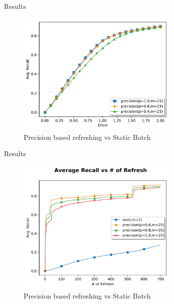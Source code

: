 \documentclass[14pt]{beamer}
\begin{document}
\begin{frame}{Results}
\begin{figure}
 \centering 
 \includegraphics[width=0.7\textwidth]{../plots/precision.pdf}
 \caption{Precision based refreshing vs Static Batch}
\end{figure}
\end{frame}

\begin{frame}{Results}
\begin{figure}
 \centering 
 \includegraphics[width=0.7\textwidth]{../plots/prec2.pdf}
 \caption{Precision based refreshing vs Static Batch}
\end{figure}
\end{frame}
\end{document}
